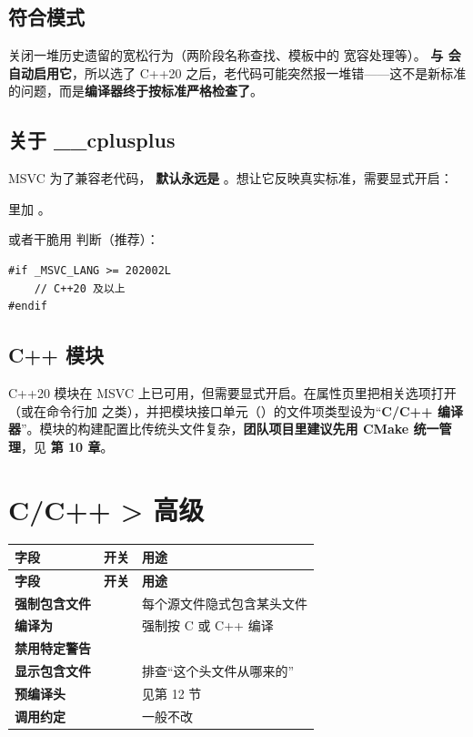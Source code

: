 {{\subsection{符合模式 }

 关闭一堆历史遗留的宽松行为（两阶段名称查找、模板中的  宽容处理等）。\textbf{ 与  会自动启用它}，所以选了 C++20 之后，老代码可能突然报一堆错——这不是新标准的问题，而是\textbf{编译器终于按标准严格检查了}。

\subsection{关于 \_\_cplusplus}

MSVC 为了兼容老代码， \textbf{默认永远是 }。想让它反映真实标准，需要显式开启：

 里加 。

或者干脆用  判断（推荐）：

\begin{lstlisting}[style=cppstyle]
#if _MSVC_LANG >= 202002L
    // C++20 及以上
#endif
\end{lstlisting}

\subsection{C++ 模块}

C++20 模块在 MSVC 上已可用，但需要显式开启。在属性页里把相关选项打开（或在命令行加  之类），并把模块接口单元（）的文件项类型设为“\textbf{C/C++ 编译器}”。模块的构建配置比传统头文件复杂，\textbf{团队项目里建议先用 CMake 统一管理}，见 \textbf{第 10 章}。

\section{C/C++ > 高级}

\begin{longtable}{L{4.8cm}L{3.6cm}L{6.0cm}}
\toprule
\textbf{字段} & \textbf{开关} & \textbf{用途} \\
\midrule
\endfirsthead
\toprule
\textbf{字段} & \textbf{开关} & \textbf{用途} \\
\midrule
\endhead
\bottomrule
\endlastfoot
\textbf{强制包含文件} &  & 每个源文件隐式包含某头文件 \\
\textbf{编译为} &   & 强制按 C 或 C++ 编译 \\
\textbf{禁用特定警告} &  & \\
\textbf{显示包含文件} &  & 排查“这个头文件从哪来的” \\
\textbf{预编译头} &    & 见第 12 节 \\
\textbf{调用约定} &    & 一般不改 \\
\end{longtable}

}}
